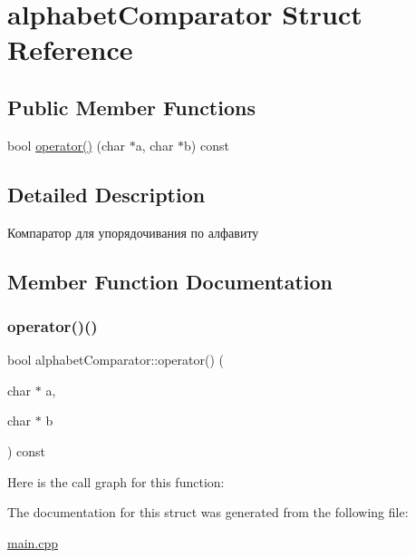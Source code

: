 \hypertarget{structalphabet_comparator}{}\section{alphabet\+Comparator Struct Reference}
\label{structalphabet_comparator}
\subsection*{Public Member Functions}
\begin{DoxyCompactItemize}
\item 
bool \mbox{\hyperlink{structalphabet_comparator_afc6db893e3b6ba666ddb0b2d5da9f4c1}{operator()}} (char $\ast$a, char $\ast$b) const
\end{DoxyCompactItemize}


\subsection{Detailed Description}
Компаратор для упорядочивания по алфавиту 

\subsection{Member Function Documentation}
\mbox{\label{structalphabet_comparator_afc6db893e3b6ba666ddb0b2d5da9f4c1}} 
\subsubsection{\texorpdfstring{operator()()}{operator()()}}
{\footnotesize\ttfamily bool alphabet\+Comparator\+::operator() (\begin{DoxyParamCaption}\item[{char $\ast$}]{a,  }\item[{char $\ast$}]{b }\end{DoxyParamCaption}) const\hspace{0.3cm}{\ttfamily [inline]}}

Here is the call graph for this function\+:


The documentation for this struct was generated from the following file\+:\begin{DoxyCompactItemize}
\item 
\mbox{\hyperlink{main_8cpp}{main.\+cpp}}\end{DoxyCompactItemize}
